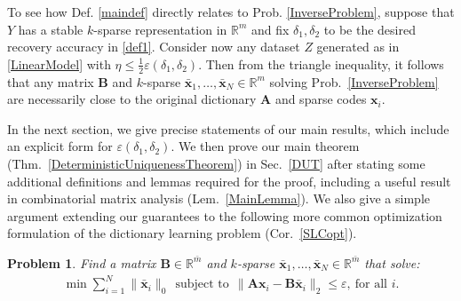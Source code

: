 \documentclass[9pt,twocolumn]{pnas-new}
\newtheorem{problem}{Problem}
\begin{document}
To see how Def. \ref{maindef} directly relates to Prob. \ref{InverseProblem}, suppose that $Y$
has a stable $k$-sparse representation in $\mathbb{R}^m$ and fix $\delta_1, \delta_2$ to be the desired recovery accuracy in \eqref{def1}. Consider now any dataset $Z$ generated as in \eqref{LinearModel} with $\eta \leq \frac{1}{2} \varepsilon(\delta_1, \delta_2)$. Then from the triangle inequality, it follows that any matrix $\mathbf{B}$ and $k$-sparse $\mathbf{\bar x}_1, \ldots, \mathbf{\bar x}_N \in \mathbb{R}^m$ solving Prob.~\ref{InverseProblem} are necessarily close to the original dictionary $\mathbf{A}$ and sparse codes $\mathbf{x}_i$. 


In the next section, we give precise statements of our main results, which include an explicit form for $\varepsilon(\delta_1, \delta_2)$. We then prove our main theorem (Thm.~\ref{DeterministicUniquenessTheorem}) in Sec.~\ref{DUT} after stating some additional definitions and lemmas required for the proof, including a useful result in combinatorial matrix analysis (Lem.~\ref{MainLemma}). We also give a simple argument extending our guarantees to the following more common optimization formulation of the dictionary learning problem (Cor.~\ref{SLCopt}).

\begin{problem}\label{OptimizationProblem}
Find a matrix $\mathbf{B} \in \mathbb{R}^{\bar m}$ and $k$-sparse $\mathbf{\bar x}_1, \ldots, \mathbf{\bar x}_N \in \mathbb{R}^{\bar m}$ that solve:
\begin{align}\label{minsum}
\min \sum_{i = 1}^N \|\mathbf{\bar x}_i\|_0 \ \ 
\text{subject to} \ \ \|\mathbf{A}\mathbf{x}_i - \mathbf{B}\mathbf{\bar x}_i\|_2 \leq \varepsilon, \ \text{for all $i$}.
\end{align}
\end{problem}
\end{document}
